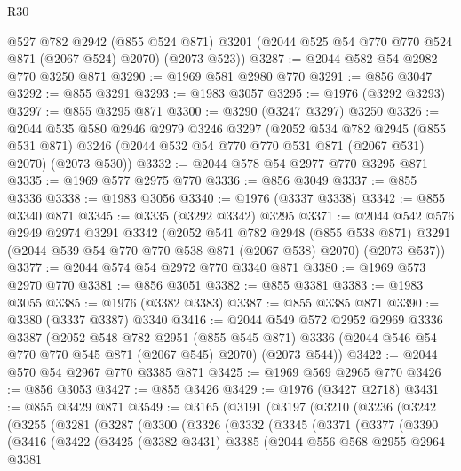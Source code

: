\begin{lexlean}{R30}
\begin{coremodule}
      @527
      @782
      @2942
      (@855 @524 @871)
      @3201
      (@2044 @525 @54 @770 @770 @524 @871 (@2067 @524) @2070)
      (@2073 @523))
@3287 := @2044 @582 @54 @2982 @770 @3250 @871
@3290 := @1969 @581 @2980 @770
@3291 := @856 @3047
@3292 := @855 @3291
@3293 := @1983 @3057
@3295 := @1976 (@3292 @3293)
@3297 := @855 @3295 @871
@3300 := @3290 (@3247 @3297) @3250
@3326 := @2044
    @535
    @580
    @2946
    @2979
    @3246
    @3297
    (@2052
      @534
      @782
      @2945
      (@855 @531 @871)
      @3246
      (@2044 @532 @54 @770 @770 @531 @871 (@2067 @531) @2070)
      (@2073 @530))
@3332 := @2044 @578 @54 @2977 @770 @3295 @871
@3335 := @1969 @577 @2975 @770
@3336 := @856 @3049
@3337 := @855 @3336
@3338 := @1983 @3056
@3340 := @1976 (@3337 @3338)
@3342 := @855 @3340 @871
@3345 := @3335 (@3292 @3342) @3295
@3371 := @2044
    @542
    @576
    @2949
    @2974
    @3291
    @3342
    (@2052
      @541
      @782
      @2948
      (@855 @538 @871)
      @3291
      (@2044 @539 @54 @770 @770 @538 @871 (@2067 @538) @2070)
      (@2073 @537))
@3377 := @2044 @574 @54 @2972 @770 @3340 @871
@3380 := @1969 @573 @2970 @770
@3381 := @856 @3051
@3382 := @855 @3381
@3383 := @1983 @3055
@3385 := @1976 (@3382 @3383)
@3387 := @855 @3385 @871
@3390 := @3380 (@3337 @3387) @3340
@3416 := @2044
    @549
    @572
    @2952
    @2969
    @3336
    @3387
    (@2052
      @548
      @782
      @2951
      (@855 @545 @871)
      @3336
      (@2044 @546 @54 @770 @770 @545 @871 (@2067 @545) @2070)
      (@2073 @544))
@3422 := @2044 @570 @54 @2967 @770 @3385 @871
@3425 := @1969 @569 @2965 @770
@3426 := @856 @3053
@3427 := @855 @3426
@3429 := @1976 (@3427 @2718)
@3431 := @855 @3429 @871
@3549 := @3165
    (@3191
      (@3197
        (@3210
          (@3236
            (@3242
              (@3255
                (@3281
                  (@3287
                    (@3300
                      (@3326
                        (@3332
                          (@3345
                            (@3371
                              (@3377
                                (@3390
                                  (@3416
                                    (@3422
                                      (@3425
                                        (@3382 @3431)
                                        @3385
                                        (@2044
                                          @556
                                          @568
                                          @2955
                                          @2964
                                          @3381

\end{coremodule}
\end{lexlean}
